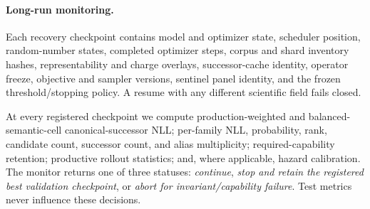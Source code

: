 \paragraph{Long-run monitoring.}
Each recovery checkpoint contains model and optimizer state, scheduler
position, random-number states, completed optimizer steps, corpus and shard
inventory hashes, representability and charge overlays, successor-cache
identity, operator freeze, objective and sampler versions, sentinel panel
identity, and the frozen threshold/stopping policy.  A resume with any
different scientific field fails closed.

At every registered checkpoint we compute production-weighted and
balanced-semantic-cell canonical-successor NLL; per-family NLL, probability, rank,
candidate count, successor count, and alias multiplicity; required-capability
retention; productive rollout statistics; and, where applicable, hazard
calibration.  The monitor returns one of three statuses:
\emph{continue}, \emph{stop and retain the registered best validation
checkpoint}, or \emph{abort for invariant/capability failure}.  Test metrics
never influence these decisions.

